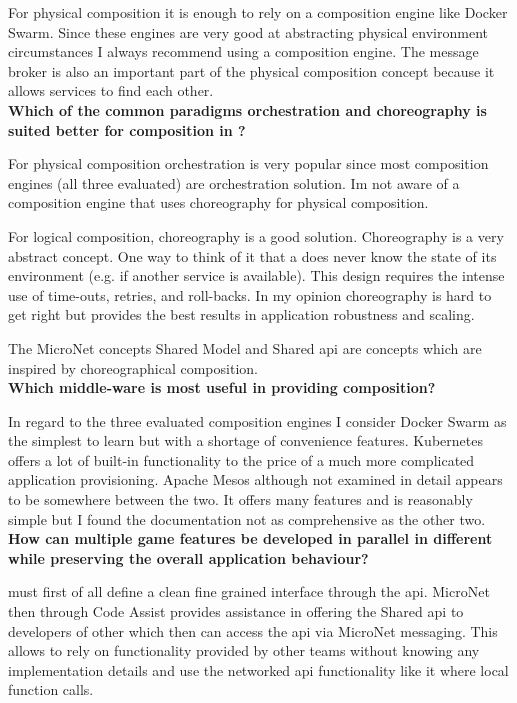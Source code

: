 For physical composition it is enough to rely on a composition engine like
Docker Swarm. Since these engines are very good at abstracting physical
environment circumstances I always recommend using a composition engine. The
message broker is also an important part of the physical composition concept
because it allows services to find each other.\\

\noindent
\textbf{Which of the common paradigms orchestration and choreography is suited better
for \ms{} composition in \ogs{}?}

For physical composition orchestration is very popular since most composition
engines (all three evaluated) are orchestration solution. Im not aware of a
composition engine that uses choreography for physical composition. 

For logical composition, choreography is a good solution. Choreography is a very
abstract concept. One way to think of it that a \ms{} does never know the state
of its environment (e.g. if another service is available). This design requires
the intense use of time-outs, retries, and roll-backs. In my opinion
choreography is hard to get right but provides the best results in
application robustness and scaling.

The MicroNet concepts Shared Model and Shared \gls{api} are concepts which are
inspired by choreographical composition. \\

\newpage
\noindent
\textbf{Which middle-ware is most useful in providing \ms{} composition?}

In regard to the three evaluated composition engines I consider Docker Swarm as
the simplest to learn but with a shortage of convenience features. Kubernetes
offers a lot of built-in functionality to the price of a much more complicated
application provisioning. Apache Mesos although not examined in detail appears
to be somewhere between the two. It offers many features and is reasonably
simple but I found the documentation not as comprehensive as the other two.\\

\noindent
\textbf{How can multiple game features be developed in parallel in different
\mss{} while preserving the overall application behaviour?}

\mss{} must first of all define a clean fine grained interface through the
\gls{api}. MicroNet then through Code Assist provides assistance in offering the
Shared \gls{api} to developers of other \mss{} which then can access the
\gls{api} via MicroNet messaging. This allows to rely on functionality provided
by other \ms{} teams without knowing any implementation details and use the
networked \gls{api} functionality like it where local function calls.

